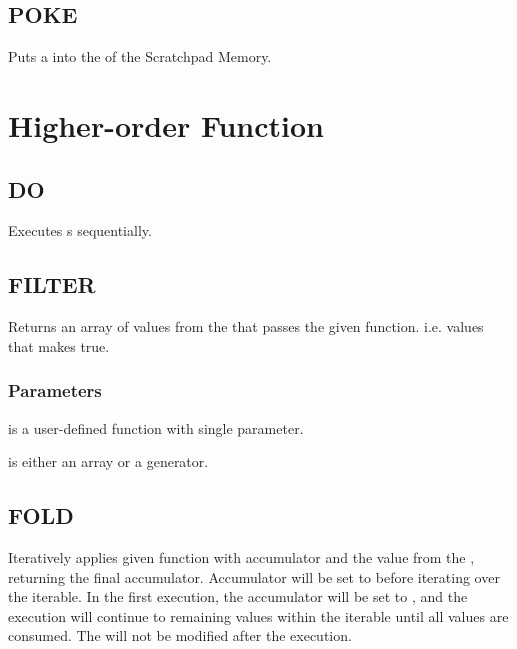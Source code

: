     \subsection{POKE}
        \par
        Puts a  into the  of the Scratchpad Memory.

\section{Higher-order Function}

    \subsection{DO}
        \par
        Executes s sequentially.
    \subsection{FILTER}
        \par
        Returns an array of values from the  that passes the given function. i.e. values that makes  true.
        \subsubsection*{Parameters}
        \begin{itemlist}
        \item {} is a user-defined function with single parameter.
        \item {} is either an array or a generator.
        \end{itemlist}
    \subsection{FOLD}
        \par
        Iteratively applies given function with accumulator and the value from the , returning the final accumulator. Accumulator will be set to  before iterating over the iterable. In the first execution, the accumulator will be set to , and the execution will continue to remaining values within the iterable until all values are consumed. The  will not be modified after the execution.
